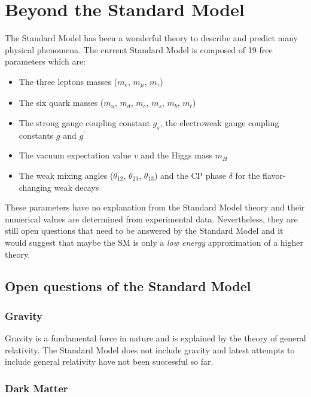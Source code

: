 \section{Beyond the Standard Model}
\label{sec:BeyondSM}

The Standard Model has been a wonderful theory to describe and predict many physical phenomena. The current Standard Model is composed of 19 free parameters which are:

\begin{itemize}
  \item The three leptons masses ($m_e$, $m_{\mu}$, $m_{\tau}$)
  \item The six quark masses ($m_u$, $m_d$, $m_c$, $m_s$, $m_b$, $m_t$)
  \item The strong gauge coupling constant $g_s$, the electroweak gauge coupling constants $g$ and $g^{\prime}$
  \item The vacuum expectation value $v$ and the Higgs mass $m_H$
  \item The weak mixing angles ($\theta_{12}$, $\theta_{23}$, $\theta_{13}$) and the CP phase $\delta$ for the flavor-changing weak decays \cite{Kobayashi:1973pt}
\end{itemize}

These parameters have no explanation from the Standard Model theory and their numerical values are determined from experimental data. Nevertheless, they are still open questions that need to be answered by the Standard Model and it would suggest that maybe the SM is only a \textit{low energy} approximation of a higher theory.

\subsection{Open questions of the Standard Model}

\subsubsection*{Gravity}

Gravity is a fundamental force in nature and is explained by the theory of general relativity. The Standard Model does not include gravity and latest attempts to include general relativity have not been successful so far.

\subsubsection*{Dark Matter}

